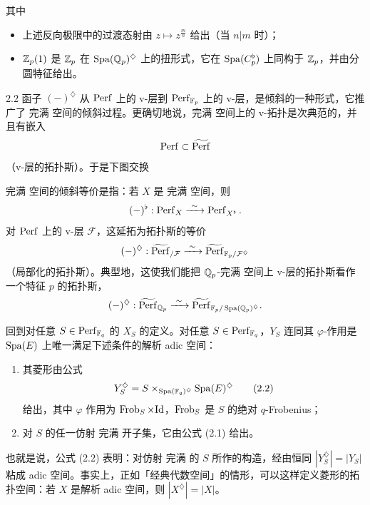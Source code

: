 其中
\begin{itemize}[leftmargin=1.6em,itemsep=0.2em]
\item 上述反向极限中的过渡态射由 $z\mapsto z^{\frac{m}{n}}$ 给出（当 $n|m$ 时）；
\item $\mathbb{Z}_p(1)$ 是 $\mathbb{Z}_p$ 在 $\operatorname{Spa}(\mathbb{Q}_p)^{\diamondsuit}$ 上的扭形式，它在 $\operatorname{Spa}(C_p^\flat)$ 上同构于 $\mathbb{Z}_p$，并由分圆特征给出。
\end{itemize}

\begin{rem}{2.2}
函子 $(-)^{\diamondsuit}$ 从 $\operatorname{Perf}$ 上的 v-层到 $\operatorname{Perf}_{\mathbb{F}_p}$ 上的 v-层，是倾斜的一种形式，它推广了 完满 空间的倾斜过程。更确切地说，完满 空间上的 v-拓扑是次典范的，并且有嵌入
\[
\operatorname{Perf}\subset\widetilde{\operatorname{Perf}}
\]
（v-层的拓扑斯）。于是下图交换
\begin{center}
\end{center}
完满 空间的倾斜等价是指：若 $X$ 是 完满 空间，则
\[
(-)^\flat:\Perf_X\xrightarrow{\ \sim\ }\Perf_{X^\flat}.
\]
对 $\operatorname{Perf}$ 上的 v-层 $\mathcal F$，这延拓为拓扑斯的等价
\[
(-)^{\diamondsuit}:\widetilde{\operatorname{Perf}}_{/\mathcal F}\xrightarrow{\ \sim\ }\widetilde{\operatorname{Perf}}_{\mathbb{F}_p/\mathcal F^{\diamondsuit}}
\]
（局部化的拓扑斯）。典型地，这使我们能把 $\mathbb{Q}_p$-完满 空间上 v-层的拓扑斯看作一个特征 $p$ 的拓扑斯，
\[
(-)^{\diamondsuit}:\widetilde{\Perf}_{\Q_p}\xrightarrow{\ \sim\ }\widetilde{\Perf}_{\F_p/\Spa(\Q_p)^{\diamondsuit}}.
\]
\label{rem:a3-2-2}
\end{rem}

回到对任意 $S\in\operatorname{Perf}_{\mathbb{F}_q}$ 的 $X_S$ 的定义。对任意 $S\in\operatorname{Perf}_{\mathbb{F}_q}$，$Y_S$ 连同其 $\varphi$-作用是 $\operatorname{Spa}(E)$ 上唯一满足下述条件的解析 adic 空间：
\begin{enumerate}[label=(\arabic*),leftmargin=2.2em,itemsep=0.1em]
\item 其菱形由公式
\begin{equation}
Y_S^{\diamondsuit}=S\times_{\operatorname{Spa}(\mathbb{F}_q)^{\diamondsuit}}\operatorname{Spa}(E)^{\diamondsuit} \tag{2.2}
\end{equation}
给出，其中 $\varphi$ 作用为 $\operatorname{Frob}_S\times\mathrm{Id}$，$\operatorname{Frob}_S$ 是 $S$ 的绝对 $q$-Frobenius；
\item 对 $S$ 的任一仿射 完满 开子集，它由公式 (2.1) 给出。
\end{enumerate}
也就是说，公式 (2.2) 表明：对仿射 完满 的 $S$ 所作的构造，经由恒同 $|Y_S^{\diamondsuit}|=|Y_S|$ 粘成 adic 空间。事实上，正如「经典代数空间」的情形，可以这样定义菱形的拓扑空间：若 $X$ 是解析 adic 空间，则 $|X^{\diamondsuit}|=|X|$。

